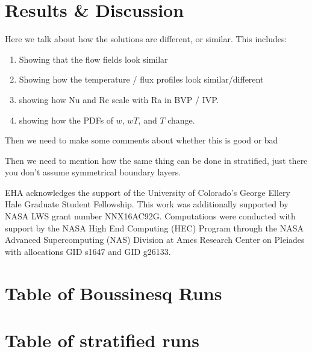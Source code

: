 \documentclass[aps, pre, onecolumn, nofootinbib, notitlepage, groupedaddress, amsfonts, amssymb, amsmath, longbibliography]{revtex4-1}
\begin{document}
\section{Results \& Discussion}
\label{sec:results}
Here we talk about how the solutions are different, or similar.  This includes:
\begin{enumerate}
\item Showing that the flow fields look similar
\item Showing how the temperature / flux profiles look similar/different
\item showing how Nu and Re scale with Ra in BVP / IVP.
\item showing how the PDFs of $w$, $wT$, and $T$ change.
\end{enumerate}

Then we need to make some comments about whether this is good or bad

Then we need to mention how the same thing can be done in stratified, just there you don't
assume symmetrical boundary layers.





\begin{acknowledgments}
EHA acknowledges the support of the University of Colorado's George 
Ellery Hale Graduate Student Fellowship.
This work was additionally supported by  NASA LWS grant number NNX16AC92G.  
Computations were conducted 
with support by the NASA High End Computing (HEC) Program through the NASA 
Advanced Supercomputing (NAS) Division at Ames Research Center on Pleiades
with allocations GID s1647 and GID g26133.
\end{acknowledgments}


\appendix
\section{Table of Boussinesq Runs}



\section{Table of stratified runs}



\end{document}
